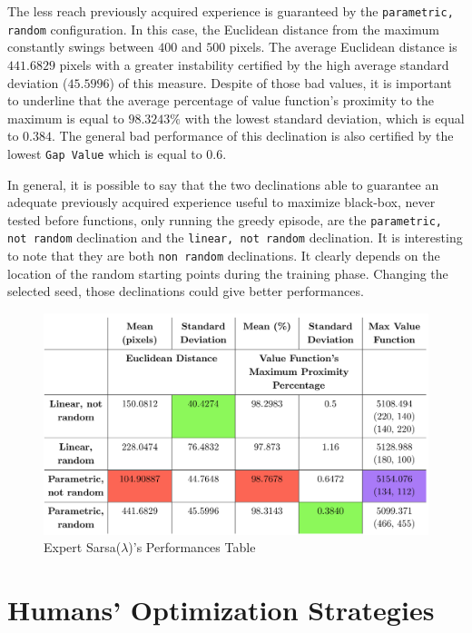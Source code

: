 The less reach previously acquired experience is guaranteed by the {\tt parametric, random} configuration. In this case, the Euclidean distance from the maximum constantly swings between $400$ and $500$ pixels. The average Euclidean distance is $441.6829$ pixels with a greater instability certified by the high average standard deviation ($45.5996$) of this measure. Despite of those bad values, it is important to underline that the average percentage of value function's proximity to the maximum is equal to $98.3243\%$ with the lowest standard deviation, which is equal to $0.384$. The general bad performance of this declination is also certified by the lowest {\tt Gap Value} which is equal to $0.6$.

In general, it is possible to say that the two declinations able to guarantee an adequate previously acquired experience useful to maximize black-box, never tested before functions, only running the greedy episode, are the {\tt parametric, not random} declination and the {\tt linear, not random} declination. It is interesting to note that they are both {\tt non random} declinations. It clearly depends on the location of the random starting points during the training phase. Changing the selected seed, those declinations could give better performances.

\begin{figure}
	\centering
	\includegraphics[width=\linewidth]{IMAGES/ExpertReasumingTable}
	\caption{Expert Sarsa($\lambda$)'s Performances Table}
	\label{fig:expertreasumingtable}
\end{figure}

\section{Humans' Optimization Strategies}

